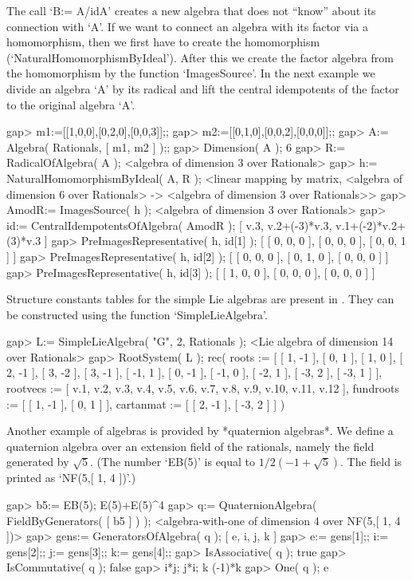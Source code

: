 The call `B:= A/idA' creates a new algebra that does not ``know'' about
its connection with `A'. If we want to connect an algebra with its factor
via a homomorphism, then we first have to create the homomorphism
(`NaturalHomomorphismByIdeal'). After this we create the factor algebra 
from the homomorphism by the function `ImagesSource'. In the next example
we divide an algebra `A' by its radical and lift the central idempotents
of the factor to the original algebra `A'.

\beginexample
    gap> m1:=[[1,0,0],[0,2,0],[0,0,3]];;
    gap> m2:=[[0,1,0],[0,0,2],[0,0,0]];;
    gap> A:= Algebra( Rationals, [ m1, m2 ] );;
    gap> Dimension( A );
    6
    gap> R:= RadicalOfAlgebra( A );
    <algebra of dimension 3 over Rationals>
    gap> h:= NaturalHomomorphismByIdeal( A, R );
    <linear mapping by matrix, <algebra of dimension 
    6 over Rationals> -> <algebra of dimension 3 over Rationals>>
    gap> AmodR:= ImagesSource( h );
    <algebra of dimension 3 over Rationals>
    gap> id:= CentralIdempotentsOfAlgebra( AmodR );
    [ v.3, v.2+(-3)*v.3, v.1+(-2)*v.2+(3)*v.3 ]
    gap> PreImagesRepresentative( h, id[1] );
    [ [ 0, 0, 0 ], [ 0, 0, 0 ], [ 0, 0, 1 ] ]
    gap> PreImagesRepresentative( h, id[2] );
    [ [ 0, 0, 0 ], [ 0, 1, 0 ], [ 0, 0, 0 ] ]
    gap> PreImagesRepresentative( h, id[3] );
    [ [ 1, 0, 0 ], [ 0, 0, 0 ], [ 0, 0, 0 ] ]
\endexample

Structure constants tables for the simple Lie algebras are present in {\GAP}.
They can be constructed using the function `SimpleLieAlgebra'.

\beginexample
    gap> L:= SimpleLieAlgebra( "G", 2, Rationals );
    <Lie algebra of dimension 14 over Rationals>
    gap> RootSystem( L );
    rec(
      roots := [ [ 1, -1 ], [ 0, 1 ], [ 1, 0 ], [ 2, -1 ], [ 3, -2 ], [ 3, -1 ], 
          [ -1, 1 ], [ 0, -1 ], [ -1, 0 ], [ -2, 1 ], [ -3, 2 ], [ -3, 1 ] ],
      rootvecs := [ v.1, v.2, v.3, v.4, v.5, v.6, v.7, v.8, v.9, v.10, v.11, v.12 
         ],
      fundroots := [ [ 1, -1 ], [ 0, 1 ] ],
      cartanmat := [ [ 2, -1 ], [ -3, 2 ] ] )
\endexample

Another example of algebras is provided by *quaternion algebras*.
We define a quaternion algebra over an extension field of the
rationals, namely the field generated by $\sqrt{5}$.
(The number `EB(5)' is equal to $1/2 (-1+\sqrt{5})$.
The field is printed as `NF(5,[ 1, 4 ])'.)

\beginexample
    gap> b5:= EB(5);
    E(5)+E(5)^4
    gap> q:= QuaternionAlgebra( FieldByGenerators( [ b5 ] ) );
    <algebra-with-one of dimension 4 over NF(5,[ 1, 4 ])>
    gap> gens:= GeneratorsOfAlgebra( q );
    [ e, i, j, k ]
    gap> e:= gens[1];; i:= gens[2];; j:= gens[3];; k:= gens[4];;
    gap> IsAssociative( q );
    true
    gap> IsCommutative( q );
    false
    gap> i*j; j*i;
    k
    (-1)*k
    gap> One( q );
    e
\endexample

